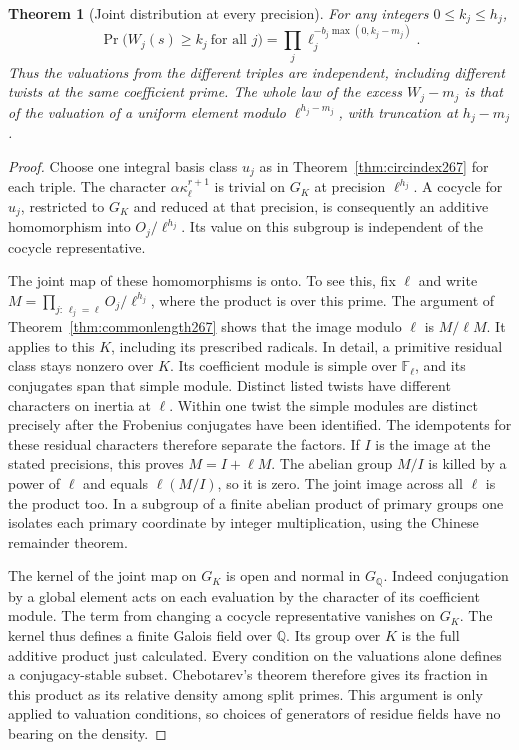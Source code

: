 \documentclass[a4paper,11pt]{article}
\newtheorem{theorem}[proposition]{Theorem}
\theoremstyle{definition}
\theoremstyle{remark}
\numberwithin{equation}{section}
\begin{document}
\begin{theorem}[Joint distribution at every precision]\leavevmode
\label{thm:laws268}
For any integers \(0\le k_j\le h_j\),
\[
 \Pr\bigl(W_j(s)\ge k_j\ \text{for all }j\bigr)
       =\prod_j\ell_j^{-b_j\max(0,k_j-m_j)} .
\]
Thus the valuations from the different triples are independent,
including different twists at the same coefficient prime. The
whole law of the excess \(W_j-m_j\) is that of the valuation
of a uniform element modulo \(\ell^{h_j-m_j}\), with truncation
at \(h_j-m_j\).
\end{theorem}
\begin{proof}
Choose one integral basis class \(u_j\) as in
Theorem~\ref{thm:circindex267} for each triple. The character
\(\alpha\kappa_\ell^{r+1}\) is trivial on \(G_K\) at
precision \(\ell^{h_j}\). A cocycle for \(u_j\), restricted
to \(G_K\) and reduced at that precision, is consequently an
additive homomorphism into \(O_j/\ell^{h_j}\). Its value on
this subgroup is independent of the cocycle representative.

The joint map of these homomorphisms is onto. To see this,
fix \(\ell\) and write \(M=\prod_{j:\,\ell_j=\ell}
O_j/\ell^{h_j}\), where the product is over this prime.
The argument of Theorem~\ref{thm:commonlength267} shows that
the image modulo \(\ell\) is \(M/\ell M\). It applies to
this \(K\), including its prescribed radicals. In detail, a
primitive residual class stays nonzero over \(K\). Its
coefficient module is simple over \(\mathbb F_\ell\), and its
conjugates span that simple module. Distinct listed twists
have different characters on inertia at \(\ell\). Within one
twist the simple modules are distinct precisely after the
Frobenius conjugates have been identified. The idempotents for
these residual characters therefore separate the factors.
If \(I\) is the image at the stated precisions, this proves
\(M=I+\ell M\). The abelian group \(M/I\) is killed by a
power of \(\ell\) and equals \(\ell(M/I)\), so it is zero.
The joint image across all \(\ell\) is the product too. In a
subgroup of a finite abelian product of primary groups one
isolates each primary coordinate by integer multiplication,
using the Chinese remainder theorem.

The kernel of the joint map on \(G_K\) is open and normal in
\(G_{\mathbb Q}\). Indeed conjugation by a global element acts
on each evaluation by the character of its coefficient module.
The term from changing a cocycle representative vanishes on
\(G_K\). The kernel thus defines a finite Galois field over
\(\mathbb Q\). Its group over \(K\) is the full additive product
just calculated. Every condition on the valuations alone
defines a conjugacy-stable subset. Chebotarev's theorem
therefore gives its fraction in this product as its relative
density among split primes. This argument is only applied to
valuation conditions, so choices of generators of residue
fields have no bearing on the density.


\end{proof}
\end{document}
